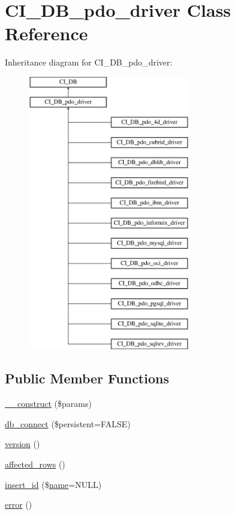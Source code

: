 \hypertarget{class_c_i___d_b__pdo__driver}{}\section{C\+I\+\_\+\+D\+B\+\_\+pdo\+\_\+driver Class Reference}
\label{class_c_i___d_b__pdo__driver}
Inheritance diagram for C\+I\+\_\+\+D\+B\+\_\+pdo\+\_\+driver\+:\begin{figure}[H]
\begin{center}
\leavevmode
\includegraphics[height=12.000000cm]{class_c_i___d_b__pdo__driver}
\end{center}
\end{figure}
\subsection*{Public Member Functions}
\begin{DoxyCompactItemize}
\item 
\mbox{\hyperlink{class_c_i___d_b__pdo__driver_a9162320adff1a1a4afd7f2372f753a3e}{\+\_\+\+\_\+construct}} (\$params)
\item 
\mbox{\hyperlink{class_c_i___d_b__pdo__driver_a52bf595e79e96cc0a7c907a9b45aeb4d}{db\+\_\+connect}} (\$persistent=F\+A\+L\+SE)
\item 
\mbox{\hyperlink{class_c_i___d_b__pdo__driver_a6080dae0886626b9a4cedb29240708b1}{version}} ()
\item 
\mbox{\hyperlink{class_c_i___d_b__pdo__driver_a77248aaad33eb132c04cc4aa3f4bc8cb}{affected\+\_\+rows}} ()
\item 
\mbox{\hyperlink{class_c_i___d_b__pdo__driver_ae61dc2c85e5516f143f6246c686bc3fc}{insert\+\_\+id}} (\$\mbox{\hyperlink{waiter_2order_8php_afb270cde4944e425a37cf277116a7f43}{name}}=N\+U\+LL)
\item 
\mbox{\hyperlink{class_c_i___d_b__pdo__driver_a43b8d30b879d4f09ceb059b02af2bc02}{error}} ()
\end{DoxyCompactItemize}
